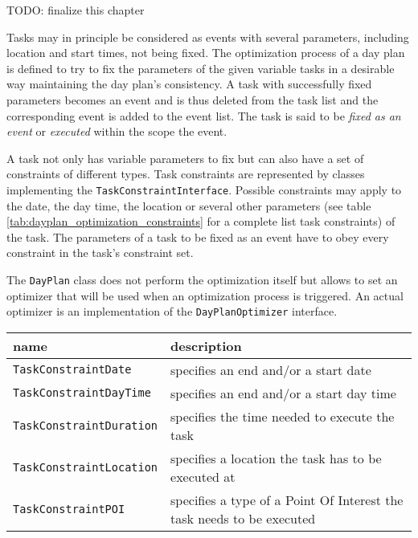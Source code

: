 TODO: finalize this chapter\newline

Tasks may in principle be considered as events with several parameters, including location and start times, not being fixed. The optimization process of a day plan is defined to try to fix the parameters of the given variable tasks in a desirable way maintaining the day plan's consistency. A task with successfully fixed parameters becomes an event and is thus deleted from the task list and the corresponding event is added to the event list. The task is said to be \emph{fixed as an event} or \emph{executed} within the scope the event.\newline

A task not only has variable parameters to fix but can also have a set of constraints of different types. Task constraints are represented by classes implementing the \texttt{TaskConstraintInterface}. Possible constraints may apply to the date, the day time, the location or several other parameters (see table \ref{tab:dayplan_optimization_constraints} for a complete list task constraints) of the task. The parameters of a task to be fixed as an event have to obey every constraint in the task's constraint set.\newline

The \texttt{DayPlan} class does not perform the optimization itself but allows to set an optimizer that will be used when an optimization process is triggered. An actual optimizer is an implementation of the \texttt{DayPlanOptimizer} interface.\newline

	\begin{tabular}[ht]{|p{4.5cm}|p{8.5cm}|}
		\hline
		name & description \\
		\hline\hline
		\texttt{TaskConstraintDate} & specifies an end and/or a start date\\
		\texttt{TaskConstraintDayTime} & specifies an end and/or a start day time\\
		\texttt{TaskConstraintDuration} & specifies the time needed to execute the task\\
		\texttt{TaskConstraintLocation} & specifies a location the task has to be executed at\\
		\texttt{TaskConstraintPOI} & specifies a type of a Point Of Interest the task needs to be executed\\	
		\hline
	\end{tabular}\newline

